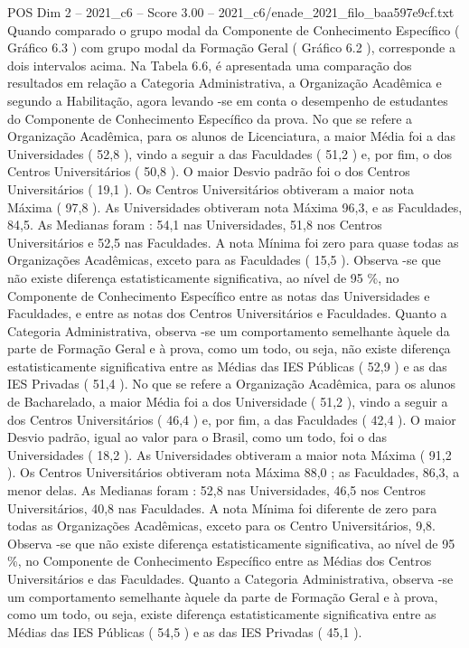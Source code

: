 \begin{textsample}{POS Dim 2 – 2021\_c6 – Score 3.00 – 2021\_c6/enade\_2021\_filo\_baa597e9cf.txt}
Quando comparado o grupo modal da Componente de Conhecimento Específico ( Gráfico 6.3 ) com grupo modal da Formação Geral ( Gráfico 6.2 ), corresponde a dois intervalos acima.
Na Tabela 6.6, é apresentada uma comparação dos resultados em relação a Categoria Administrativa, a Organização Acadêmica e segundo a Habilitação, agora levando -se em conta o desempenho de estudantes do Componente de Conhecimento Específico da prova.
No que se refere a Organização Acadêmica, para os alunos de Licenciatura, a maior Média foi a das Universidades ( 52,8 ), vindo a seguir a das Faculdades ( 51,2 ) e, por fim, o dos Centros Universitários ( 50,8 ).
O maior Desvio padrão foi o dos Centros Universitários ( 19,1 ).
Os Centros Universitários obtiveram a maior nota Máxima ( 97,8 ).
As Universidades obtiveram nota Máxima 96,3, e as Faculdades, 84,5.
As Medianas foram : 54,1 nas Universidades, 51,8 nos Centros Universitários e 52,5 nas Faculdades.
A nota Mínima foi zero para quase todas as Organizações Acadêmicas, exceto para as Faculdades ( 15,5 ).
Observa -se que não existe diferença estatisticamente significativa, ao nível de 95 \%, no Componente de Conhecimento Específico entre as notas das Universidades e Faculdades, e entre as notas dos Centros Universitários e Faculdades.
Quanto a Categoria Administrativa, observa -se um comportamento semelhante àquele da parte de Formação Geral e à prova, como um todo, ou seja, não existe diferença estatisticamente significativa entre as Médias das IES Públicas ( 52,9 ) e as das IES Privadas ( 51,4 ).
No que se refere a Organização Acadêmica, para os alunos de Bacharelado, a maior Média foi a dos Universidade ( 51,2 ), vindo a seguir a dos Centros Universitários ( 46,4 ) e, por fim, a das Faculdades ( 42,4 ).
O maior Desvio padrão, igual ao valor para o Brasil, como um todo, foi o das Universidades ( 18,2 ).
As Universidades obtiveram a maior nota Máxima ( 91,2 ).
Os Centros Universitários obtiveram nota Máxima 88,0 ; as Faculdades, 86,3, a menor delas.
As Medianas foram : 52,8 nas Universidades, 46,5 nos Centros Universitários, 40,8 nas Faculdades.
A nota Mínima foi diferente de zero para todas as Organizações Acadêmicas, exceto para os Centro Universitários, 9,8.
Observa -se que não existe diferença estatisticamente significativa, ao nível de 95 \%, no Componente de Conhecimento Específico entre as Médias dos Centros Universitários e das Faculdades.
Quanto a Categoria Administrativa, observa -se um comportamento semelhante àquele da parte de Formação Geral e à prova, como um todo, ou seja, existe diferença estatisticamente significativa entre as Médias das IES Públicas ( 54,5 ) e as das IES Privadas ( 45,1 ).

\end{textsample}
